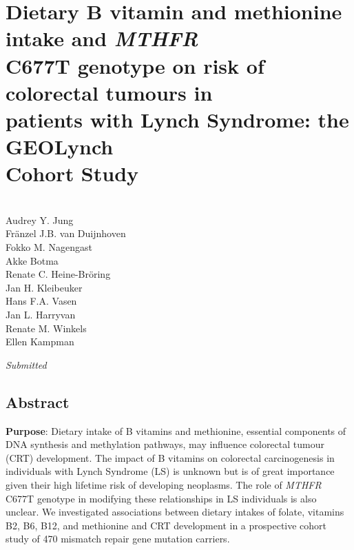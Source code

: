 \chapter[Dietary B vitamin and methionine intake and \emph{MTHFR} C677T genotype on risk of colorectal tumours in patients with Lynch Syndrome: the GEOLynch Cohort Study]{Dietary B vitamin and methionine intake and \emph{MTHFR}\\C677T genotype on risk of colorectal tumours in\\patients with Lynch Syndrome: the GEOLynch\\Cohort Study} 
\label{chap6_lynch}


\quad\\

\noindent
Audrey Y. Jung\\ 
Fr{\"a}nzel J.B. van Duijnhoven\\ 
Fokko M. Nagengast\\ 
Akke Botma\\ 
Renate C. Heine-Br{\"o}ring\\ 
Jan H. Kleibeuker\\ 
Hans F.A. Vasen\\ 
Jan L. Harryvan\\ 
Renate M. Winkels\\ 
Ellen Kampman\\

\begin{table}[b]
\emph{Submitted}
\end{table}
 
\newpage 

\section*{Abstract}
\noindent \textbf{Purpose}: Dietary intake of B vitamins and methionine, essential components of DNA synthesis and methylation pathways, may influence colorectal tumour (CRT) development. The impact of B vitamins on colorectal carcinogenesis in individuals with Lynch Syndrome (LS) is unknown but is of great importance given their high lifetime risk of developing neoplasms. The role of \emph{MTHFR} C677T genotype in modifying these relationships in LS individuals is also unclear. We investigated associations between dietary intakes of folate, vitamins B2, B6, B12, and methionine and CRT development in a prospective cohort study of 470 mismatch repair gene mutation carriers.

